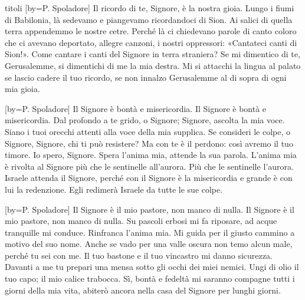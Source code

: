 \begin{songs}{titoli}
[by={P. Spoladore}]
\beginchorus
Il ricordo di te, Signore,
è la nostra gioia. 
\endchorus
\beginverse
Lungo i fiumi di Babilonia,
là sedevamo e piangevamo
ricordandoci di Sion.
Ai salici di quella terra appendemmo le nostre cetre.
\endverse
\beginverse
Perché là ci chiedevano parole di canto coloro che ci avevano deportato,
allegre canzoni, i nostri oppressori: «Cantateci canti di Sion!».
\endverse
\beginverse
Come cantare i canti del Signore
in terra straniera?
Se mi dimentico di te, Gerusalemme, si dimentichi di me la mia destra.
\endverse
\beginverse
Mi si attacchi la lingua al palato
se lascio cadere il tuo ricordo,
se non innalzo Gerusalemme al di sopra di ogni mia gioia.
\endverse
\endsong

[by={P. Spoladore}]
\beginchorus
Il Signore è bontà e misericordia. Il Signore è bontà e misericordia. 
\endchorus
\beginverse
Dal profondo a te grido, o Signore;
Signore, ascolta la mia voce.
Siano i tuoi orecchi attenti
alla voce della mia supplica.
\endverse
\beginverse
Se consideri le colpe, o Signore,
Signore, chi ti può resistere?
Ma con te è il perdono:
così avremo il tuo timore.
\endverse
\beginverse
Io spero, Signore.
Spera l'anima mia, attende la sua parola.
L'anima mia è rivolta al Signore
più che le sentinelle all'aurora.
\endverse
\beginverse
Più che le sentinelle l'aurora.
Israele attenda il Signore,
perché con il Signore è la misericordia e grande è con lui la redenzione.
Egli redimerà Israele da tutte le sue colpe.
\endverse
\endsong

[by={P. Spoladore}]
\beginchorus
Il Signore è il mio pastore, non manco di nulla. 
\endchorus
\beginverse
Il Signore è il mio pastore, non manco di nulla.
Su pascoli erbosi mi fa riposare,
ad acque tranquille mi conduce.
Rinfranca l'anima mia.
\endverse
\beginverse
Mi guida per il giusto cammino a motivo del suo nome.
Anche se vado per una valle oscura
non temo alcun male, perché tu sei con me.
Il tuo bastone e il tuo vincastro mi danno sicurezza.
\endverse
\beginverse
Davanti a me tu prepari una mensa
sotto gli occhi dei miei nemici.
Ungi di olio il tuo capo;
il mio calice trabocca.
\endverse
\beginverse
Sì, bontà e fedeltà mi saranno compagne
tutti i giorni della mia vita,
abiterò ancora nella casa del Signore
per lunghi giorni.
\endverse
\endsong


\end{songs}
